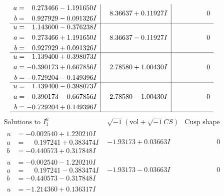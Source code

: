 \documentclass[1p]{elsarticle_modified}
\theoremstyle{definition}
\newcommand{\I}{\sqrt{-1}}
\begin{document}
$$\begin{array}{c|c|c}
\begin{aligned}
a &= \phantom{-}0.273466 - 1.191650 I \\
b &= \phantom{-}0.927929 - 0.091326 I\end{aligned}
 & \phantom{-}8.36637 + 0.11927 I & \phantom{-0.000000 } 0 \\ \hline\begin{aligned}
u &= \phantom{-}1.143600 - 0.376238 I \\
a &= \phantom{-}0.273466 + 1.191650 I \\
b &= \phantom{-}0.927929 + 0.091326 I\end{aligned}
 & \phantom{-}8.36637 - 0.11927 I & \phantom{-0.000000 } 0 \\ \hline\begin{aligned}
u &= \phantom{-}1.139400 + 0.398073 I \\
a &= -0.390173 + 0.667856 I \\
b &= -0.729204 - 0.149396 I\end{aligned}
 & \phantom{-}2.78580 + 1.00430 I & \phantom{-0.000000 } 0 \\ \hline\begin{aligned}
u &= \phantom{-}1.139400 - 0.398073 I \\
a &= -0.390173 - 0.667856 I \\
b &= -0.729204 + 0.149396 I\end{aligned}
 & \phantom{-}2.78580 - 1.00430 I & \phantom{-0.000000 } 0\\
 \hline 
 \end{array}$$\newpage$$\begin{array}{c|c|c}  
\text{Solutions to }I^u_{1}& \I (\text{vol} + \sqrt{-1}CS) & \text{Cusp shape}\\
 \hline 
\begin{aligned}
u &= -0.002540 + 1.220210 I \\
a &= \phantom{-}0.197241 + 0.383474 I \\
b &= -0.440573 + 0.317848 I\end{aligned}
 & -1.93173 + 0.03663 I & \phantom{-0.000000 } 0 \\ \hline\begin{aligned}
u &= -0.002540 - 1.220210 I \\
a &= \phantom{-}0.197241 - 0.383474 I \\
b &= -0.440573 - 0.317848 I\end{aligned}
 & -1.93173 - 0.03663 I & \phantom{-0.000000 } 0 \\ \hline\begin{aligned}
u &= -1.214360 + 0.136317 I \\

\end{aligned}
\end{array}$$
\end{document}
